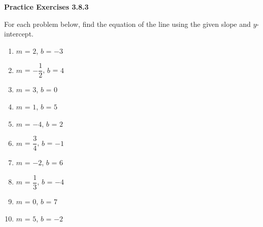  \vspace{1ex}
\noindent\textbf{Practice Exercises 3.8.3}

\vspace{0.75ex}

For each problem below, find the equation of the line using the given slope and $y$-intercept.
\begin{multicols}{2}
\begin{enumerate}[noitemsep, label = \color{blue}\arabic*. ]
    \item $ m $ = $2$, $b$ = $-3$
    \item $ m $ = $-\dfrac{1}{2}$, $b$ = $4$
    \item $ m $ = $3$, $b$ = $0$
    \item $ m $ = $1$, $b$ = $5$
    \item $ m $ = $-4$, $b$ = $2$
    \item $ m $ = $\dfrac{3}{4}$, $b$ = $-1$
    \item $ m $ = $-2$, $b$ = $6$
    \item $ m $ = $\dfrac{1}{3}$, $b$ = $-4$
    \item $ m $ = $0$, $b$ = $7$
    \item $ m $ = $5$, $b$ = $-2$
\end{enumerate}
\end{multicols}


